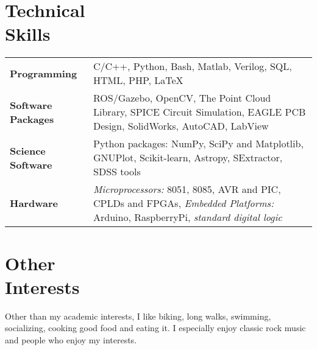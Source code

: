 \documentclass[margin,line]{res}
\begin{document}
\begin{resume}
\section{\sc Technical \\Skills} 
\begin{tabular}{@{}p{1.3in}p{4.3in}}
\textbf{Programming} & C/C++, Python, Bash, Matlab, Verilog, SQL, HTML, PHP, \LaTeX \\  
\vspace*{-0.06in}
\textbf{Software Packages} & 
\vspace*{-0.06in}
ROS/Gazebo, OpenCV, The Point Cloud Library, SPICE Circuit Simulation, EAGLE PCB Design, SolidWorks, AutoCAD, LabView\\ 
\vspace*{-0.06in}
\textbf{Science Software} &
\vspace*{-0.06in}
Python packages: NumPy, SciPy and Matplotlib, GNUPlot, Scikit-learn, Astropy, SExtractor, SDSS tools \\
\vspace*{-0.06in}
\textbf{Hardware} &
\vspace*{-0.06in}
\textit{Microprocessors:} 8051, 8085, AVR and PIC, CPLDs and FPGAs, \textit{Embedded Platforms:} Arduino, RaspberryPi, \textit{standard digital logic} \\     
\end{tabular}

\section{\sc Other \\Interests}
Other than my academic interests, I like biking, long walks, swimming, socializing, cooking good food and eating it. I especially enjoy classic rock music and people who enjoy my interests.


\end{resume}
\end{document}
